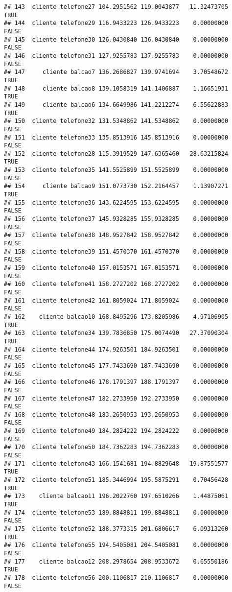\documentclass[
]{article}
\begin{document}
\begin{verbatim}
## 143  cliente telefone27 104.2951562 119.0043877   11.32473705     TRUE
## 144  cliente telefone29 116.9433223 126.9433223    0.00000000    FALSE
## 145  cliente telefone30 126.0430840 136.0430840    0.00000000    FALSE
## 146  cliente telefone31 127.9255783 137.9255783    0.00000000    FALSE
## 147     cliente balcao7 136.2686827 139.9741694    3.70548672     TRUE
## 148     cliente balcao8 139.1058319 141.1406887    1.16651931     TRUE
## 149     cliente balcao6 134.6649986 141.2212274    6.55622883     TRUE
## 150  cliente telefone32 131.5348862 141.5348862    0.00000000    FALSE
## 151  cliente telefone33 135.8513916 145.8513916    0.00000000    FALSE
## 152  cliente telefone28 115.3919529 147.6365460   28.63215824     TRUE
## 153  cliente telefone35 141.5525899 151.5525899    0.00000000    FALSE
## 154     cliente balcao9 151.0773730 152.2164457    1.13907271     TRUE
## 155  cliente telefone36 143.6224595 153.6224595    0.00000000    FALSE
## 156  cliente telefone37 145.9328285 155.9328285    0.00000000    FALSE
## 157  cliente telefone38 148.9527842 158.9527842    0.00000000    FALSE
## 158  cliente telefone39 151.4570370 161.4570370    0.00000000    FALSE
## 159  cliente telefone40 157.0153571 167.0153571    0.00000000    FALSE
## 160  cliente telefone41 158.2727202 168.2727202    0.00000000    FALSE
## 161  cliente telefone42 161.8059024 171.8059024    0.00000000    FALSE
## 162    cliente balcao10 168.8495296 173.8205986    4.97106905     TRUE
## 163  cliente telefone34 139.7836850 175.0074490   27.37090304     TRUE
## 164  cliente telefone44 174.9263501 184.9263501    0.00000000    FALSE
## 165  cliente telefone45 177.7433690 187.7433690    0.00000000    FALSE
## 166  cliente telefone46 178.1791397 188.1791397    0.00000000    FALSE
## 167  cliente telefone47 182.2733950 192.2733950    0.00000000    FALSE
## 168  cliente telefone48 183.2650953 193.2650953    0.00000000    FALSE
## 169  cliente telefone49 184.2824222 194.2824222    0.00000000    FALSE
## 170  cliente telefone50 184.7362283 194.7362283    0.00000000    FALSE
## 171  cliente telefone43 166.1541681 194.8829648   19.87551577     TRUE
## 172  cliente telefone51 185.3446994 195.5875291    0.70456428     TRUE
## 173    cliente balcao11 196.2022760 197.6510266    1.44875061     TRUE
## 174  cliente telefone53 189.8848811 199.8848811    0.00000000    FALSE
## 175  cliente telefone52 188.3773315 201.6806617    6.09313260     TRUE
## 176  cliente telefone55 194.5405081 204.5405081    0.00000000    FALSE
## 177    cliente balcao12 208.2978654 208.9533672    0.65550186     TRUE
## 178  cliente telefone56 200.1106817 210.1106817    0.00000000    FALSE

\end{verbatim}
\end{document}
